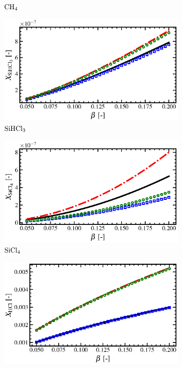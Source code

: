 \documentclass[final, letterpaper, square, comma, numbers, sort&compress]{elsarticle}
\begin{document}
\begin{figure}
\begin{subfigure}{0.49\textwidth}
        \caption{$\rm CH_4$}
    \end{subfigure}
    \begin{subfigure}{0.49\textwidth}
        \centering
        \includegraphics[width=0.99\textwidth]{beta-vs-SiHCl3-compare}
        \caption{$\rm SiHCl_3$}
    \end{subfigure}
    \begin{subfigure}{0.49\textwidth}
        \centering
        \includegraphics[width=0.99\textwidth]{beta-vs-SiCl4-compare}
        \caption{$\rm SiCl_4$}
    \end{subfigure}
    \begin{subfigure}{0.49\textwidth}
        \centering
        \includegraphics[width=0.99\textwidth]{beta-vs-HCl-compare}

\end{subfigure}
\end{figure}
\end{document}
